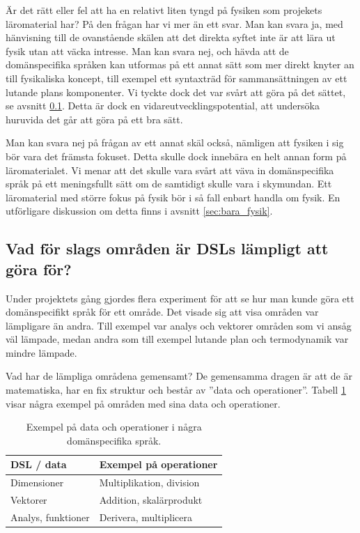 \begin{binge}
Är det rätt eller fel att ha en relativt liten tyngd på fysiken som projekets
läromaterial har? På den frågan har vi mer än ett svar. Man kan svara ja, med
hänvisning till de ovanstående skälen att det direkta syftet inte är att lära
ut fysik utan att väcka intresse. Man kan svara nej, och hävda att de
domänspecifika språken kan utformas på ett annat sätt som mer direkt
knyter an till fysikaliska koncept, till exempel ett syntaxträd för
sammansättningen av ett lutande plans komponenter. Vi tyckte dock det var svårt
att göra på det sättet, se avsnitt \ref{sec:lampligt}. Detta är dock en
vidareutvecklingspotential, att undersöka huruvida det går att göra på ett bra
sätt.

Man kan svara nej på frågan av ett annat skäl också, nämligen att fysiken i sig
bör vara det främsta fokuset. Detta skulle dock innebära en helt annan form på
läromaterialet. Vi menar att det skulle vara svårt att väva in domänspecifika
språk på ett meningsfullt sätt om de samtidigt skulle vara i skymundan. Ett
läromaterial med större fokus på fysik bör i så fall enbart handla om fysik. En
utförligare diskussion om detta finns i avsnitt \ref{sec:bara_fysik}.

\subsection{Vad för slags områden är DSLs lämpligt att göra för?}
\label{sec:lampligt}

Under projektets gång gjordes flera experiment för att se hur man kunde göra ett domänspecifikt språk för ett område. Det visade sig att visa områden var lämpligare än andra. Till exempel var analys och vektorer områden som vi ansåg väl lämpade, medan andra som till exempel lutande plan och termodynamik var mindre lämpade.

Vad har de lämpliga områdena gemensamt? De gemensamma dragen är att de är matematiska, har en fix struktur och består av ''data och operationer''. Tabell \ref{tab:data_och_ops} visar några exempel på områden med sina data och operationer.

\begin{table}[tph]
\centering
\caption{Exempel på data och operationer i några domänspecifika språk.}
\label{tab:data_och_ops}
\begin{tabular}{@{}l|l@{}}
\toprule
DSL / data & Exempel på operationer \\ \midrule
Dimensioner & Multiplikation, division \\
Vektorer & Addition, skalärprodukt \\
Analys, funktioner & Derivera, multiplicera \\ \bottomrule
\end{tabular}
\end{table}


\end{binge}
